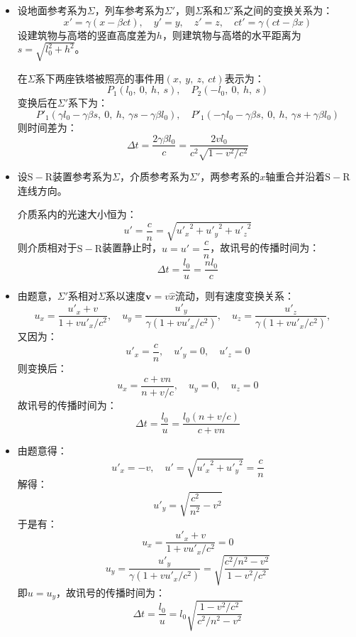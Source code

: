 \documentclass[a4paper,fontset=none]{ctexart}
\begin{document}
\begin{itemize}
    \item[4.]
    设地面参考系为$\varSigma$，列车参考系为$\varSigma'$，则$\varSigma$系和$\varSigma'$系之间的变换关系为：
    \[
        x' = \gamma(x-\beta ct),\quad y' = y,\quad z' = z,\quad ct' = \gamma(ct-\beta x)
    \]
    设建筑物与高塔的竖直高度差为$h$，则建筑物与高塔的水平距离为$s=\sqrt{l_0^2+h^2}$。

    在$\varSigma$系下两座铁塔被照亮的事件用$(x,\ y,\ z,\ ct)$表示为：
    \[
        P_1(l_0,\ 0,\ h,\ s),\quad P_2(-l_0,\ 0,\ h,\ s)
    \]
    变换后在$\varSigma'$系下为：
    \[
        P'_1(\gamma l_0-\gamma \beta s,\ 0,\ h,\ \gamma s-\gamma \beta l_0),\quad P'_1(-\gamma l_0-\gamma \beta s,\ 0,\ h,\ \gamma s+\gamma \beta l_0)
    \]
    则时间差为：
    \[
        \Delta t = \frac{2\gamma\beta l_0}{c} = \frac{2vl_0}{c^2\sqrt{1 - v^2/c^2}}
    \]

    \item[5.(1)]
    设$\mathrm{S-R}$装置参考系为$\varSigma$，介质参考系为$\varSigma'$，两参考系的$x$轴重合并沿着$\mathrm{S-R}$连线方向。

    介质系内的光速大小恒为：
    \[
        u' = \frac{c}{n} = \sqrt{{u'_x}^2 + {u'_y}^2 + {u'_z}^2}
    \]
    则介质相对于$\mathrm{S-R}$装置静止时，$u=u'=\dfrac{c}{n}$，故讯号的传播时间为：
    \[
        \Delta t = \frac{l_0}{u} = \frac{nl_0}{c}
    \]

    \item[5.(2)]
    由题意，$\varSigma'$系相对$\varSigma$系以速度$\bm{v}=v\hat{x}$流动，则有速度变换关系：
    \[
        u_x = \frac{u'_x+v}{1+vu'_x/c^2},\quad
        u_y = \frac{u'_y}{\gamma(1+vu'_x/c^2)},\quad
        u_z = \frac{u'_z}{\gamma(1+vu'_x/c^2)},\quad
    \]
    又因为：
    \[
        u'_x = \frac{c}{n},\quad u'_y = 0,\quad u'_z = 0
    \]
    则变换后：
    \[
        u_x = \frac{c+vn}{n+v/c},\quad u_y = 0,\quad u_z = 0
    \]
    故讯号的传播时间为：
    \[
        \Delta t = \frac{l_0}{u} = \frac{l_0(n+v/c)}{c+vn}
    \]

    \item[5.(3)]
    由题意得：
    \[
        u'_x = -v,\quad u' = \sqrt{{u'_x}^2 + {u'_y}^2} = \frac{c}{n}
    \]
    解得：
    \[
        u'_y = \sqrt{\frac{c^2}{n^2} - v^2}
    \]
    于是有：
    \[
        u_x = \frac{u'_x+v}{1+vu'_x/c^2} = 0
    \]
    \[
        u_y = \frac{u'_y}{\gamma(1+vu'_x/c^2)} = \sqrt{\frac{c^2/n^2 - v^2}{1 - v^2/c^2}}
    \]
    即$u=u_y$，故讯号的传播时间为：
    \[
        \Delta t = \frac{l_0}{u} = l_0\sqrt{\frac{1 - v^2/c^2}{c^2/n^2 - v^2}}
    \]


\end{itemize}
\end{document}
